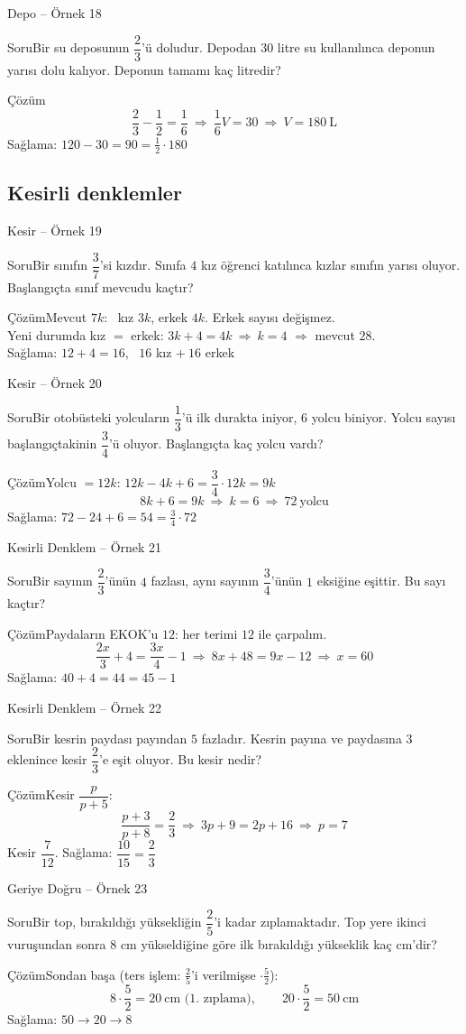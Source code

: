 \documentclass[aspectratio=169,11pt]{beamer}
\newcommand{\soru}[3]{%
\begin{frame}{#1}
  \begin{block}{Soru}\large #2\end{block}
  \pause
  \begin{exampleblock}{Çözüm}\large #3\end{exampleblock}
\end{frame}}
\begin{document}
\soru{Depo -- Örnek 18}
{Bir su deposunun \(\dfrac{2}{3}\)'ü doludur. Depodan \(30\) litre su kullanılınca deponun yarısı dolu kalıyor. Deponun tamamı kaç litredir?}
{\[\frac{2}{3}-\frac{1}{2}=\frac{1}{6}\ \Rightarrow\ \frac{1}{6}V=30\ \Rightarrow\ V=180\ \text{L}\]
Sağlama: \(120-30=90=\frac{1}{2}\cdot 180\) \checkmark}

\subsection{Kesirli denklemler}
\soru{Kesir -- Örnek 19}
{Bir sınıfın \(\dfrac{3}{7}\)'si kızdır. Sınıfa \(4\) kız öğrenci katılınca kızlar sınıfın yarısı oluyor. Başlangıçta sınıf mevcudu kaçtır?}
{Mevcut \(7k\): \ kız \(3k\), erkek \(4k\). Erkek sayısı değişmez.\\[2pt]
Yeni durumda kız \(=\) erkek: \quad \(3k+4=4k\ \Rightarrow\ k=4\) \(\Rightarrow\) mevcut \(28\).\\[3pt]
Sağlama: \(12+4=16\), \ \(16\) kız \(+\ 16\) erkek \checkmark}

\soru{Kesir -- Örnek 20}
{Bir otobüsteki yolcuların \(\dfrac{1}{3}\)'ü ilk durakta iniyor, \(6\) yolcu biniyor. Yolcu sayısı başlangıçtakinin \(\dfrac{3}{4}\)'ü oluyor. Başlangıçta kaç yolcu vardı?}
{Yolcu \(=12k\): \quad \(12k-4k+6=\dfrac{3}{4}\cdot 12k=9k\)
\[8k+6=9k\ \Rightarrow\ k=6\ \Rightarrow\ 72\ \text{yolcu}\]
Sağlama: \(72-24+6=54=\frac{3}{4}\cdot 72\) \checkmark}

\soru{Kesirli Denklem -- Örnek 21}
{Bir sayının \(\dfrac{2}{3}\)'ünün \(4\) fazlası, aynı sayının \(\dfrac{3}{4}\)'ünün \(1\) eksiğine eşittir. Bu sayı kaçtır?}
{Paydaların EKOK'u \(12\): her terimi \(12\) ile çarpalım.
\[\frac{2x}{3}+4=\frac{3x}{4}-1\ \Rightarrow\ 8x+48=9x-12\ \Rightarrow\ x=60\]
Sağlama: \(40+4=44=45-1\) \checkmark}

\soru{Kesirli Denklem -- Örnek 22}
{Bir kesrin paydası payından \(5\) fazladır. Kesrin payına ve paydasına \(3\) eklenince kesir \(\dfrac{2}{3}\)'e eşit oluyor. Bu kesir nedir?}
{Kesir \(\dfrac{p}{p+5}\):
\[\frac{p+3}{p+8}=\frac{2}{3}\ \Rightarrow\ 3p+9=2p+16\ \Rightarrow\ p=7\]
Kesir \(\dfrac{7}{12}\). \quad Sağlama: \(\dfrac{10}{15}=\dfrac{2}{3}\) \checkmark}

\soru{Geriye Doğru -- Örnek 23}
{Bir top, bırakıldığı yüksekliğin \(\dfrac{2}{5}\)'i kadar zıplamaktadır. Top yere ikinci vuruşundan sonra \(8\) cm yükseldiğine göre ilk bırakıldığı yükseklik kaç cm'dir?}
{Sondan başa (ters işlem: \(\frac{2}{5}\)'i verilmişse \(\cdot\frac{5}{2}\)):
\[8\cdot\frac{5}{2}=20\ \text{cm (1. zıplama)},\qquad 20\cdot\frac{5}{2}=50\ \text{cm}\]
Sağlama: \(50\to 20\to 8\) \checkmark}
\end{document}
